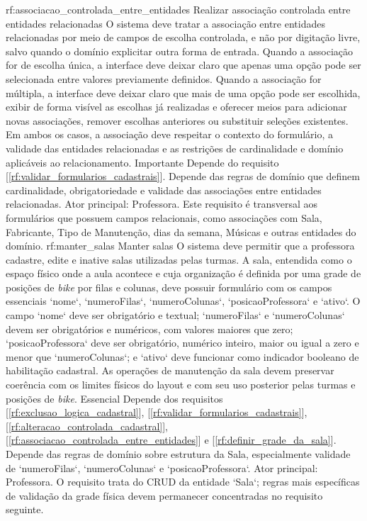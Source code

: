 \reqfuncfull
{rf:associacao_controlada_entre_entidades}
{Realizar associação controlada entre entidades relacionadas}
{O sistema deve tratar a associação entre entidades relacionadas por meio de campos de escolha controlada, e não por digitação livre, salvo quando o domínio explicitar outra forma de entrada. Quando a associação for de escolha única, a interface deve deixar claro que apenas uma opção pode ser selecionada entre valores previamente definidos. Quando a associação for múltipla, a interface deve deixar claro que mais de uma opção pode ser escolhida, exibir de forma visível as escolhas já realizadas e oferecer meios para adicionar novas associações, remover escolhas anteriores ou substituir seleções existentes. Em ambos os casos, a associação deve respeitar o contexto do formulário, a validade das entidades relacionadas e as restrições de cardinalidade e domínio aplicáveis ao relacionamento.}
{Importante}
{Depende do requisito [\ref{rf:validar_formularios_cadastrais}]. Depende das regras de domínio que definem cardinalidade, obrigatoriedade e validade das associações entre entidades relacionadas.}
{Ator principal: Professora. Este requisito é transversal aos formulários que possuem campos relacionais, como associações com Sala, Fabricante, Tipo de Manutenção, dias da semana, Músicas e outras entidades do domínio.}
\reqfuncfull
{rf:manter_salas}
{Manter salas}
{O sistema deve permitir que a professora cadastre, edite e inative salas utilizadas pelas turmas. A sala, entendida como o espaço físico onde a aula acontece e cuja organização é definida por uma grade de posições de \textit{bike} por filas e colunas, deve possuir formulário com os campos essenciais `nome`, `numeroFilas`, `numeroColunas`, `posicaoProfessora` e `ativo`. O campo `nome` deve ser obrigatório e textual; `numeroFilas` e `numeroColunas` devem ser obrigatórios e numéricos, com valores maiores que zero; `posicaoProfessora` deve ser obrigatório, numérico inteiro, maior ou igual a zero e menor que `numeroColunas`; e `ativo` deve funcionar como indicador booleano de habilitação cadastral. As operações de manutenção da sala devem preservar coerência com os limites físicos do layout e com seu uso posterior pelas turmas e posições de \textit{bike}.}
{Essencial}
{Depende dos requisitos [\ref{rf:exclusao_logica_cadastral}], [\ref{rf:validar_formularios_cadastrais}], [\ref{rf:alteracao_controlada_cadastral}], [\ref{rf:associacao_controlada_entre_entidades}] e [\ref{rf:definir_grade_da_sala}]. Depende das regras de domínio sobre estrutura da Sala, especialmente validade de `numeroFilas`, `numeroColunas` e `posicaoProfessora`.}
{Ator principal: Professora. O requisito trata do CRUD da entidade `Sala`; regras mais específicas de validação da grade física devem permanecer concentradas no requisito seguinte.}

